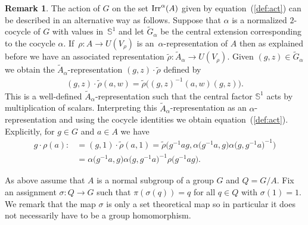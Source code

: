 \documentclass[11pt]{article}
\numberwithin{equation}{section}
\def\S{\mathbb{S}}
\DeclareMathOperator{\Irr}{\textup{Irr}}
\theoremstyle{definition}
\newtheorem{Rem}[Th]{Remark}
\numberwithin{equation}{section}
\begin{document}
\begin{Rem}The action of $G$ on the set $\Irr^{\alpha}(A)$ given by equation~(\ref{def:act}) can be
described in an alternative way as follows. Suppose that $\alpha$ is a normalized $2$-cocycle of
$G$ with values in~$\S^{1}$ and let $\widetilde{G}_{\alpha}$ be the central extension corresponding
to the cocycle $\alpha$. If~$\rho\colon A\rightarrow U(V_{\rho})$ is an~$\alpha$-representation of $A$
then as explained before we have an associated representation \mbox{$\tilde{\rho}\colon \tilde{A}_{\alpha}\to U(V_{\rho})$}.
Given $(g,z)\in \widetilde{G}_{\alpha}$ we obtain the $\tilde{A}_{\alpha}$-representation
$(g,z)\cdot \tilde{\rho}$ defined by
\begin{gather*}
(g,z)\cdot \tilde{\rho}(a,w)=\tilde{\rho}\big((g,z)^{-1}(a,w)(g,z)\big).
\end{gather*}
This is a well-defined $\tilde{A}_{\alpha}$-representation such that the central factor
$\S^{1}$ acts by multiplication of scalars. Interpreting this $\tilde{A}_{\alpha}$-representation as an
$\alpha$-representation and using the cocycle identities we obtain equation~(\ref{def:act}). Explicitly,
for $g\in G$ and $a\in A$ we have
\begin{align*}
g\cdot \rho(a):\!&=(g,1)\cdot \tilde{\rho}(a,1)= \tilde{\rho}\big(g^{-1}ag,\alpha\big(g^{-1}a,g\big)\alpha\big(g,g^{-1}a\big)^{-1}\big)
\\
&=\alpha\big(g^{-1}a,g\big)\alpha\big(g,g^{-1}a\big)^{-1} \rho\big(g^{-1}ag\big).
\end{align*}
\end{Rem}


As above assume that $A$ is a normal subgroup of a group $G$ and $Q=G/A$. Fix an assignment
$\sigma \colon Q \rightarrow G$ such that $\pi(\sigma(q)) = q$ for all $q \in Q$ with $\sigma(1)
= 1$. We remark that the map $\sigma$ is only a set theoretical map so in particular it does
not necessarily have to be a group homomorphism.
\end{document}
